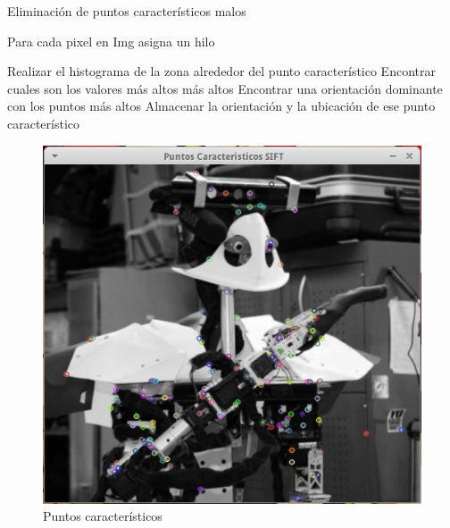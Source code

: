 \begin{algorithm}[H]
\caption{Eliminación de puntos característicos malos}
 Para cada pixel en Img asigna un hilo\;
 
 {
	{
		Realizar el histograma de la zona alrededor del punto característico\;
		Encontrar cuales son los valores más altos más altos\;
		Encontrar una orientación dominante con los puntos más altos\;
		Almacenar la orientación y la ubicación de ese punto característico\; 
				
	}
}
	
\end{algorithm}




\begin{figure}[h]
			\centering
				\includegraphics[scale=1]{img/KeyPoints.png}
			\caption{Puntos característicos}
\end{figure}















